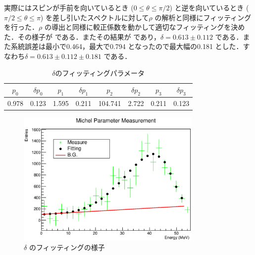 実際にはスピンが手前を向いているとき ($0 \leq \theta \leq \pi / 2$) と逆を向いているとき ($\pi / 2 \leq \theta \leq \pi$) を差し引いたスペクトルに対して$\rho$ の解析と同様にフィッティングを行った．$\rho$ の導出と同様に較正係数を動かして適切なフィッティングを決めた．その様子が である．またその結果が であり，$\delta=0.613\pm0.112$ である．また系統誤差は最小で0.464，最大で0.794 となったので最大幅の0.181 とした．すなわち$\delta=0.613\pm0.112\pm0.181$ である．
\begin{table}[hbt]
\centering
\caption{$\delta$のフィッティングパラメータ}
\begin{tabular}{cccccccc}
$p_0$ & $\delta p_0$ & $p_1$ & $\delta p_1$ & $p_2$ & $\delta p_2$ & $p_3$ & $\delta p_3$ \\ \hline
0.978 & 0.123 & 1.595 & 0.211 & 104.741 & 2.722 & 0.211 & 0.123 \\
\end{tabular}
\label{hatano_tab:delta}
\end{table}

\begin{figure}[hbt]
\centering
\includegraphics[width=0.8\textwidth]{figure/hatano/delta.eps}
\caption{$\delta$ のフィッティングの様子}
\label{hatano_fig:delta}
\end{figure}

%
